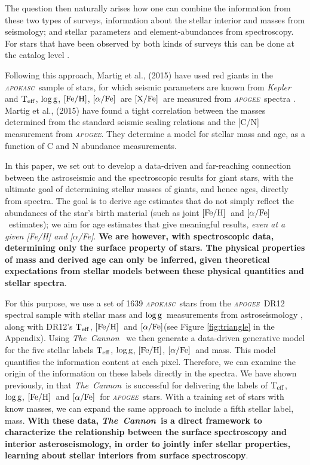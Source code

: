 \documentclass[12pt, preprint]{aastex}
\newcommand{\project}[1]{\textsl{#1}}
\newcommand{\tc}{\project{The~Cannon}}
\newcommand{\apogee}{\project{\textsc{apogee}}}
\newcommand{\apokasc}{\project{\textsc{apokasc}}}
\newcommand{\kepler}{\project{Kepler}}
\newcommand{\teff}{\mbox{$\rm T_{eff}$}}
\newcommand{\feh}{\mbox{$\rm [Fe/H]$}}
\newcommand{\xfe}{\mbox{$\rm [X/Fe]$}}
\newcommand{\alphafe}{\mbox{$\rm [\alpha/Fe]$}}
\newcommand{\logg}{\mbox{$\rm \log g$}}
\begin{document}
The question then naturally arises how one can combine the information from these two types of surveys, information about the stellar interior and masses from seismology; and
stellar parameters and element-abundances from spectroscopy. For stars that have been observed by both kinds of surveys this can be done at the catalog level \citep{Martig2014}.

Following this approach, Martig et al., (2015) have used red giants in the \apokasc\ sample of stars, for which seismic parameters are known from \kepler\ \citep{P2014} and \teff, \logg, \feh, \alphafe\  are \xfe\ are measured from \apogee\ spectra \citep{Ahn2014}. Martig et al., (2015) have found a tight correlation between the masses determined from the standard seismic scaling relations and the [C/N] measurement from \apogee.  They determine a model for stellar mass and age, as a function of C and N abundance measurements. 

In this paper, we set out to develop a data-driven and far-reaching connection between the astroseismic and the spectroscopic results for giant stars, with the ultimate goal of determining stellar masses of giants, and hence ages, directly from spectra. The goal is to derive age estimates that do not simply reflect the abundances of the star's birth material (such as joint \feh\ and \alphafe\ estimates); we aim for age estimates that give meaningful results, {\sl even at a given [Fe/H] and [$\alpha$/Fe]}. \textbf{We are however, with spectroscopic data, determining only the surface property of stars. The physical properties of mass and derived age can only be inferred, given theoretical expectations from stellar models between these physical quantities and stellar spectra}.

For this purpose, we use a set of 1639 \apokasc\ stars from the \apogee\ DR12 spectral sample with stellar mass and \logg\ measurements from astroseismology \citep{P2014}, along with DR12's  \teff, \feh\ and \alphafe (see Figure \ref{fig:triangle} in the Appendix).  Using \tc~ \citep{Ness2015} we then generate a data-driven generative model for the five stellar labels \teff, \logg, \feh, \alphafe\ and mass. This model quantifies the information content at each pixel.  
Therefore, we can examine the origin of the information on these labels directly in the spectra. We have shown previously, in  \citet[][and Ho et al., in prep]{Ness2015}   that \tc\ is successful for delivering the labels of \teff, \logg, \feh\  and \alphafe\ for \apogee\ stars. With a training set of stars with know masses, we can expand the same approach to include a fifth stellar label, mass. \textbf{With these data,  \tc\ is a direct framework to characterize the relationship between the surface spectroscopy and interior asteroseismology, in order to jointly infer stellar properties, learning about stellar interiors from surface spectroscopy}.
\end{document}
